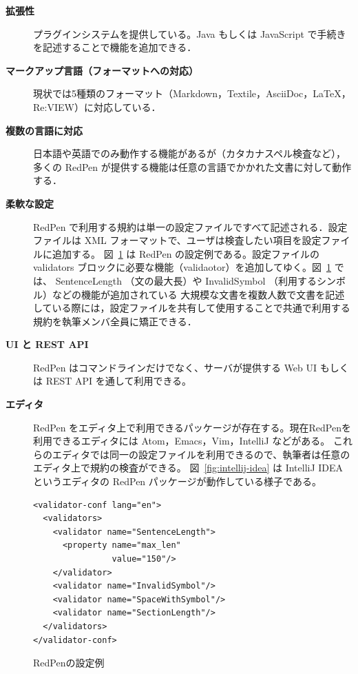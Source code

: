 \documentclass[a4j,twocolumn]{jarticle}
\begin{document}
\begin{description}

\item[{\bf 拡張性}]
   プラグインシステムを提供している。Java もしくは JavaScript で手続きを記述することで機能を追加できる．

 \item[{\bf マークアップ言語（フォーマットへの対応）}]
  現状では5種類のフォーマット（Markdown，Textile，AsciiDoc，LaTeX，Re:VIEW）に対応している．

\item[{\bf 複数の言語に対応}]
  日本語や英語でのみ動作する機能があるが（カタカナスペル検査など），多くの RedPen が提供する機能は任意の言語でかかれた文書に対して動作する．

\item[{\bf 柔軟な設定}]
  RedPen で利用する規約は単一の設定ファイルですべて記述される．設定ファイルは XML フォーマットで、ユーザは検査したい項目を設定ファイルに追加する。
  図~\ref{fig:conf} は RedPen の設定例である。設定ファイルの validators ブロックに必要な機能（validaotor）を追加してゆく。図~\ref{fig:conf} では、
  SentenceLength （文の最大長）や InvalidSymbol （利用するシンボル）などの機能が追加されている
  大規模な文書を複数人数で文書を記述している際には，設定ファイルを共有して使用することで共通で利用する規約を執筆メンバ全員に矯正できる．

\item[{\bf UI と REST API}]
  RedPen はコマンドラインだけでなく、サーバが提供する Web UI もしくは REST API を通して利用できる。

\item[{\bf エディタ}]
  RedPen をエディタ上で利用できるパッケージが存在する。現在RedPenを利用できるエディタには Atom，Emacs，Vim，IntelliJ などがある。
  これらのエディタでは同一の設定ファイルを利用できるので、執筆者は任意のエディタ上で規約の検査ができる。
  図~\ref{fig:intellij-idea} は IntelliJ IDEA というエディタの RedPen パッケージが動作している様子である。

\end{description}

\begin{figure}
  \scriptsize
  \small
  \begin{verbatim}
<validator-conf lang="en">
  <validators>
    <validator name="SentenceLength">
      <property name="max_len"
                value="150"/>
    </validator>
    <validator name="InvalidSymbol"/>
    <validator name="SpaceWithSymbol"/>
    <validator name="SectionLength"/>
  </validators>
</validator-conf>
  \end{verbatim}
  \normalsize
  \caption{RedPenの設定例}
  \label{fig:conf}
\end{figure}
\end{document}
